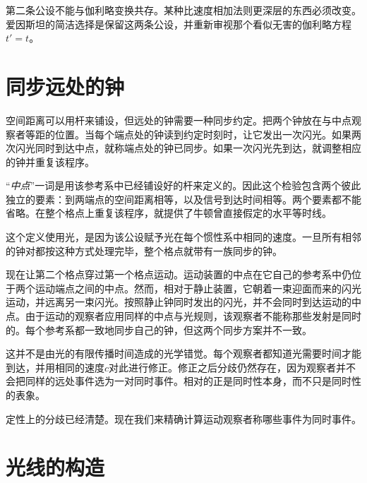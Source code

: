 第二条公设不能与伽利略变换共存。某种比速度相加法则更深层的东西必须改变。爱因斯坦的简洁选择是保留这两条公设，并重新审视那个看似无害的伽利略方程\(t'=t\)。

\section{同步远处的钟}

空间距离可以用杆来铺设，但远处的钟需要一种同步约定。把两个钟放在与中点观察者等距的位置。当每个端点处的钟读到约定时刻时，让它发出一次闪光。如果两次闪光同时到达中点，就称端点处的钟已同步。如果一次闪光先到达，就调整相应的钟并重复该程序。

“\emph{中点}”一词是用该参考系中已经铺设好的杆来定义的。因此这个检验包含两个彼此独立的要素：到两端点的空间距离相等，以及信号到达时间相等。两个要素都不能省略。在整个格点上重复该程序，就提供了牛顿曾直接假定的水平等时线。

这个定义使用光，是因为该公设赋予光在每个惯性系中相同的速度。一旦所有相邻的钟对都按这种方式处理完毕，整个格点就带有一族同步的钟。

现在让第二个格点穿过第一个格点运动。运动装置的中点在它自己的参考系中仍位于两个运动端点之间的中点。然而，相对于静止装置，它朝着一束迎面而来的闪光运动，并远离另一束闪光。按照静止钟同时发出的闪光，并不会同时到达运动的中点。由于运动的观察者应用同样的中点与光规则，该观察者不能称那些发射是同时的。每个参考系都一致地同步自己的钟，但这两个同步方案并不一致。

这并不是由光的有限传播时间造成的光学错觉。每个观察者都知道光需要时间才能到达，并用相同的速度\(c\)对此进行修正。修正之后分歧仍然存在，因为观察者并不会把同样的远处事件选为一对同时事件。相对的正是同时性本身，而不只是同时性的表象。

\begin{classroomqa}
\end{classroomqa}

定性上的分歧已经清楚。现在我们来精确计算运动观察者称哪些事件为同时事件。

\section{光线的构造}

